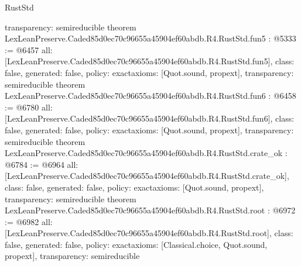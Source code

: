 \begin{lexlean}{RustStd}
\begin{coremodule}
{  transparency: semireducible
}
theorem LexLeanPreserve.Caded85d0ec70c96655a45904ef60abdb.R4.RustStd.fun5 : @5333 := @6457 {
  all: [LexLeanPreserve.Caded85d0ec70c96655a45904ef60abdb.R4.RustStd.fun5],
  class: false,
  generated: false,
  policy: exact{axioms: [Quot.sound, propext]},
  transparency: semireducible
}
theorem LexLeanPreserve.Caded85d0ec70c96655a45904ef60abdb.R4.RustStd.fun6 : @6458 := @6780 {
  all: [LexLeanPreserve.Caded85d0ec70c96655a45904ef60abdb.R4.RustStd.fun6],
  class: false,
  generated: false,
  policy: exact{axioms: [Quot.sound, propext]},
  transparency: semireducible
}
theorem LexLeanPreserve.Caded85d0ec70c96655a45904ef60abdb.R4.RustStd.crate_ok : @6784 := @6964 {
  all: [LexLeanPreserve.Caded85d0ec70c96655a45904ef60abdb.R4.RustStd.crate_ok],
  class: false,
  generated: false,
  policy: exact{axioms: [Quot.sound, propext]},
  transparency: semireducible
}
theorem LexLeanPreserve.Caded85d0ec70c96655a45904ef60abdb.R4.RustStd.root : @6972 := @6982 {
  all: [LexLeanPreserve.Caded85d0ec70c96655a45904ef60abdb.R4.RustStd.root],
  class: false,
  generated: false,
  policy: exact{axioms: [Classical.choice, Quot.sound, propext]},
  transparency: semireducible
}


\end{coremodule}
\end{lexlean}
